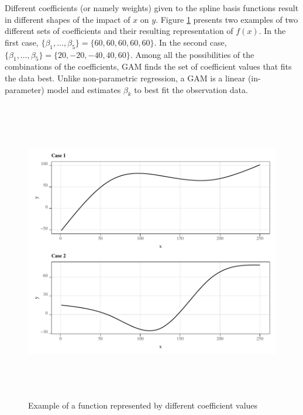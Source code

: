 \documentclass[
]{article}
\begin{document}
Different coefficients (or namely weights) given to the spline basis functions result in different shapes of the impact of \(x\) on \(y\). Figure \ref{fig:ex-fx} presents two examples of two different sets of coefficients and their resulting representation of \(f(x)\). In the first case, \(\{\beta_1, \dots, \beta_5\} = \{60, 60, 60, 60, 60\}\). In the second case, \(\{\beta_1, \dots, \beta_5\} = \{20, -20, -40, 40, 60\}\). Among all the possibilities of the combinations of the coefficients, GAM finds the set of coefficient values that fits the data best. Unlike non-parametric regression, a GAM is a linear (in-parameter) model and estimates $\beta_k$ to best fit the observation data.

\begin{figure}[H]

{\centering \includegraphics[width=6in,height=500px,]{../../Figures/g_il_y} 

}

\caption{Example of a function represented by different coefficient values}\label{fig:ex-fx}
\end{figure}

\clearpage

  
\end{document}
